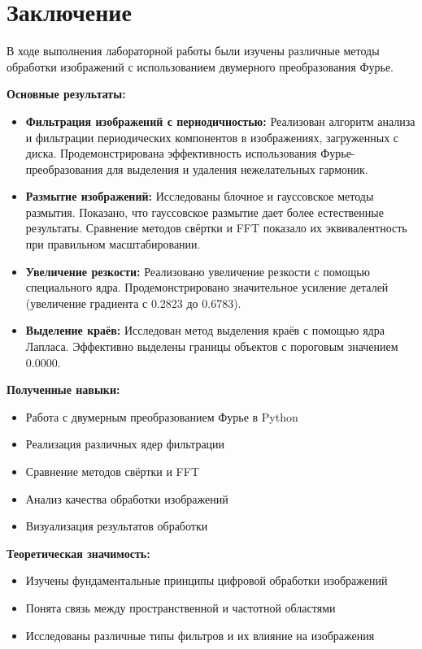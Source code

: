 \section*{Заключение}

В ходе выполнения лабораторной работы были изучены различные методы обработки изображений с использованием двумерного преобразования Фурье.

\textbf{Основные результаты:}
\begin{itemize}
    \item \textbf{Фильтрация изображений с периодичностью:} Реализован алгоритм анализа и фильтрации периодических компонентов в изображениях, загруженных с диска. Продемонстрирована эффективность использования Фурье-преобразования для выделения и удаления нежелательных гармоник.
    
    \item \textbf{Размытие изображений:} Исследованы блочное и гауссовское методы размытия. Показано, что гауссовское размытие дает более естественные результаты. Сравнение методов свёртки и FFT показало их эквивалентность при правильном масштабировании.
    
    \item \textbf{Увеличение резкости:} Реализовано увеличение резкости с помощью специального ядра. Продемонстрировано значительное усиление деталей (увеличение градиента с 0.2823 до 0.6783).
    
    \item \textbf{Выделение краёв:} Исследован метод выделения краёв с помощью ядра Лапласа. Эффективно выделены границы объектов с пороговым значением 0.0000.
\end{itemize}

\textbf{Полученные навыки:}
\begin{itemize}
    \item Работа с двумерным преобразованием Фурье в Python
    \item Реализация различных ядер фильтрации
    \item Сравнение методов свёртки и FFT
    \item Анализ качества обработки изображений
    \item Визуализация результатов обработки
\end{itemize}

\textbf{Теоретическая значимость:}
\begin{itemize}
    \item Изучены фундаментальные принципы цифровой обработки изображений
    \item Понята связь между пространственной и частотной областями
    \item Исследованы различные типы фильтров и их влияние на изображения
\end{itemize}

